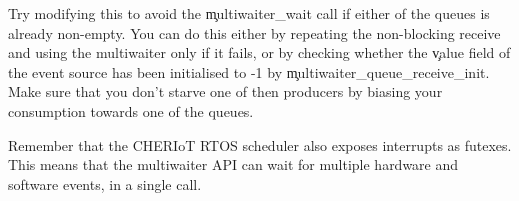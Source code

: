 \codelisting[filename=examples/multiwaiter/queue.cc,marker=multiwaiter_use,label=lst:multiwaiterwait,caption="Using a multiwaiter to wait for either of two queues."]{}

Try modifying this to avoid the \c{multiwaiter_wait} call if either of the queues is already non-empty.
You can do this either by repeating the non-blocking receive and using the multiwaiter only if it fails, or by checking whether the \c{value} field of the event source has been initialised to -1 by \c{multiwaiter_queue_receive_init}.
Make sure that you don't starve one of then producers by biasing your consumption towards one of the queues.

Remember that the CHERIoT RTOS scheduler also exposes interrupts as futexes.
This means that the multiwaiter API can wait for multiple hardware and software events, in a single call.
